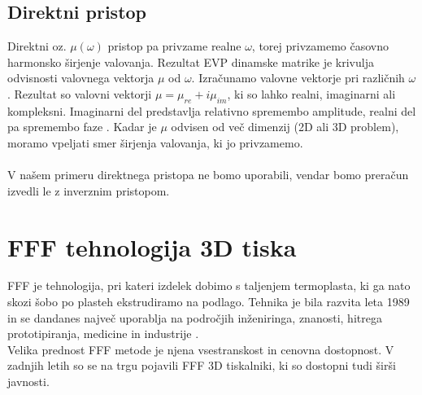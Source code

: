 \documentclass[12pt]{report}
\begin{document}
\subsection{Direktni pristop}
Direktni oz. $\mu(\omega)$ pristop pa privzame realne $\omega$, torej privzamemo časovno harmonsko širjenje valovanja. Rezultat \ac{EVP} dinamske matrike je krivulja odvisnosti valovnega vektorja $\mu$
od $\omega$. Izračunamo valovne vektorje pri različnih $\omega$. Rezultat so valovni vektorji $\mu = \mu_{re} + i\mu_{im}$, ki so lahko realni, imaginarni ali kompleksni. Imaginarni del predstavlja relativno spremembo amplitude, realni del pa
spremembo faze \cite{vanbelle, kosir}. Kadar je $\mu$ odvisen od več dimenzij (2D ali 3D problem), moramo vpeljati smer širjenja valovanja, ki jo privzamemo.
\\
\\
V našem primeru direktnega pristopa ne bomo uporabili, vendar bomo preračun izvedli le z inverznim pristopom.

\section{FFF tehnologija 3D tiska}
\ac{FFF} je tehnologija, pri kateri izdelek dobimo s taljenjem termoplasta, ki ga nato skozi šobo po plasteh ekstrudiramo na podlago. Tehnika je bila razvita leta 1989 in se dandanes
največ uporablja na področjih inženiringa, znanosti, hitrega prototipiranja, medicine in industrije \cite{fff_article}.
\\
Velika prednost \ac{FFF} metode je njena vsestranskost in cenovna dostopnost. V zadnjih letih so se na trgu pojavili \ac{FFF} 3D tiskalniki, ki so dostopni tudi 
širši javnosti. 
\end{document}
